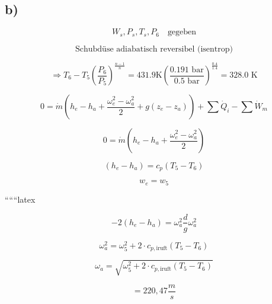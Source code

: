 

\subsection*{b)}

\[
W_s, P_s, T_s, P_6 \quad \text{gegeben}
\]

\[
\text{Schubdüse adiabatisch reversibel (isentrop)}
\]

\[
\Rightarrow T_6 - T_5 \left( \frac{P_6}{P_5} \right)^{\frac{n-1}{n}} = 431.9 \text{K} \left( \frac{0.191 \text{ bar}}{0.5 \text{ bar}} \right)^{\frac{0.4}{1.4}} = 328.0 \text{ K}
\]

\[
0 = \dot{m} \left( h_e - h_a + \frac{\omega_e^2 - \omega_a^2}{2} + g (z_e - z_a) \right) + \sum \dot{Q}_i - \sum \dot{W}_m
\]

\[
0 = \dot{m} \left( h_e - h_a + \frac{\omega_e^2 - \omega_a^2}{2} \right)
\]

\[
(h_e - h_a) = c_p \left( T_5 - T_6 \right)
\]

\[
w_e = w_5
\]

``````latex


\[
-2 \left( h_e - h_a \right) = \omega_a^2 \frac{d}{g} \omega_a^2
\]

\[
\omega_a^2 = \omega_5^2 + 2 \cdot c_{p, \text{iruft}} \left( T_5 - T_6 \right)
\]

\[
\omega_a = \sqrt{\omega_5^2 + 2 \cdot c_{p, \text{iruft}} \left( T_5 - T_6 \right)}
\]

\[
= 220,47 \frac{m}{s}
\]